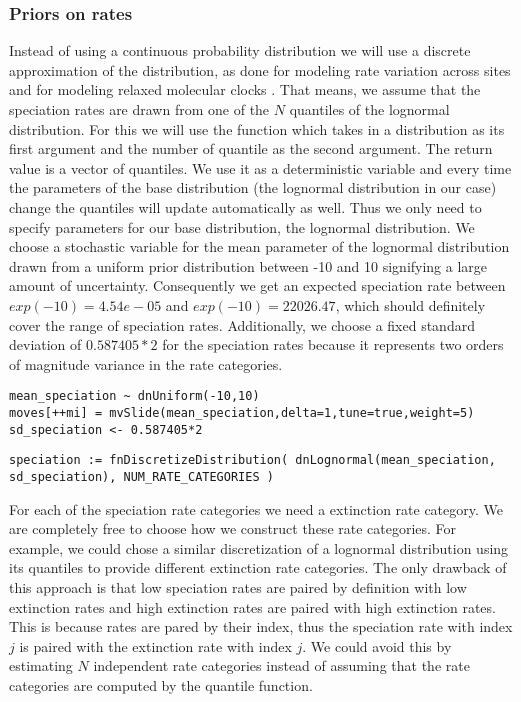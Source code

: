 \subsubsection{Priors on rates}
Instead of using a continuous probability distribution we will use a discrete approximation of the distribution, as done for modeling rate variation across sites \citep{Yang1994a} and for modeling relaxed molecular clocks \citep{Drummond2006}.
That means, we assume that the speciation rates are drawn from one of the $N$ quantiles of the lognormal distribution.
For this we will use the function  which takes in a distribution as its first argument and the number of quantile as the second argument.
The return value is a vector of quantiles.
We use it as a deterministic variable and every time the parameters of the base distribution (\IE the lognormal distribution in our case) change the quantiles will update automatically as well.
Thus we only need to specify parameters for our base distribution, the lognormal distribution.
We choose a stochastic variable for the mean parameter of the lognormal distribution drawn from a uniform prior distribution between -10 and 10 signifying a large amount of uncertainty.
Consequently we get an expected speciation rate between $exp(-10)=4.54e-05$ and $exp(-10)=22026.47$, which should definitely cover the range of speciation rates.
Additionally, we choose a fixed standard deviation of $0.587405*2$ for the speciation rates because it represents two orders of magnitude variance in the rate categories.
{\tt \begin{snugshade*}
\begin{lstlisting}
mean_speciation ~ dnUniform(-10,10)
moves[++mi] = mvSlide(mean_speciation,delta=1,tune=true,weight=5)
sd_speciation <- 0.587405*2
\end{lstlisting}
\end{snugshade*}}

{\tt \begin{snugshade*}
\begin{lstlisting}
speciation := fnDiscretizeDistribution( dnLognormal(mean_speciation, sd_speciation), NUM_RATE_CATEGORIES )
\end{lstlisting}
\end{snugshade*}}
For each of the speciation rate categories we need a extinction rate category.
We are completely free to choose how we construct these rate categories.
For example, we could chose a similar discretization of a lognormal distribution using its quantiles to provide different extinction rate categories.
The only drawback of this approach is that low speciation rates are paired by definition with low extinction rates and high extinction rates are paired with high extinction rates.
This is because rates are pared by their index, thus the speciation rate with index $j$ is paired with the extinction rate with index $j$.
We could avoid this by estimating $N$ independent rate categories instead of assuming that the rate categories are computed by the quantile function.

